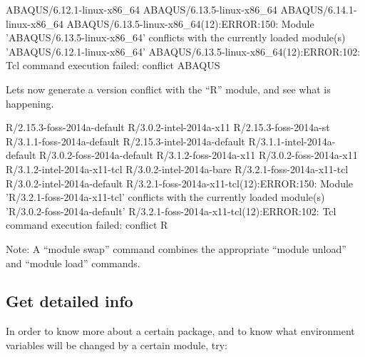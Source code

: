 \begin{prompt}
ABAQUS/6.12.1-linux-x86_64
ABAQUS/6.13.5-linux-x86_64
ABAQUS/6.14.1-linux-x86_64
ABAQUS/6.13.5-linux-x86_64(12):ERROR:150: Module 'ABAQUS/6.13.5-linux-x86_64' conflicts with the currently loaded module(s) 'ABAQUS/6.12.1-linux-x86_64'
ABAQUS/6.13.5-linux-x86_64(12):ERROR:102: Tcl command execution failed: conflict ABAQUS
\end{prompt}
\fi
\ifleuven
\begin{prompt}
Lets now generate a version conflict with the ``R'' module, and see what
is happening.

R/2.15.3-foss-2014a-default  R/3.0.2-intel-2014a-x11
R/2.15.3-foss-2014a-st       R/3.1.1-foss-2014a-default
R/2.15.3-intel-2014a-default R/3.1.1-intel-2014a-default
R/3.0.2-foss-2014a-default   R/3.1.2-foss-2014a-x11
R/3.0.2-foss-2014a-x11       R/3.1.2-intel-2014a-x11-tcl
R/3.0.2-intel-2014a-bare     R/3.2.1-foss-2014a-x11-tcl
R/3.0.2-intel-2014a-default
R/3.2.1-foss-2014a-x11-tcl(12):ERROR:150: Module 'R/3.2.1-foss-2014a-x11-tcl' conflicts with the currently loaded module(s) 'R/3.0.2-foss-2014a-default'
R/3.2.1-foss-2014a-x11-tcl(12):ERROR:102: Tcl command execution failed: conflict    R
\end{prompt}
\fi

Note: A ``module swap'' command combines the appropriate ``module unload''
and ``module load'' commands.

\subsection{Get detailed info}

In order to know more about a certain package, and to know what environment
variables will be changed by a certain module, try:

